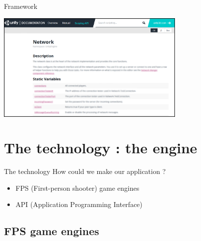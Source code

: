 \documentclass[a4paper,10pt]{beamer}
\begin{document}
			\begin{frame}{Framework}
				\centerline{\includegraphics[height=150pt]{images/network/networkclass.png}}
			\end{frame}
		
	\section{The technology : the engine}
			
			\begin{frame}{The technology}
				How could we make our application ?
				\begin{itemize}
					\item FPS (First-person shooter) game engines
					\item API (Application Programming Interface)

				\end{itemize}
			\end{frame}
			
		\subsection{FPS game engines}
		
\end{document}
